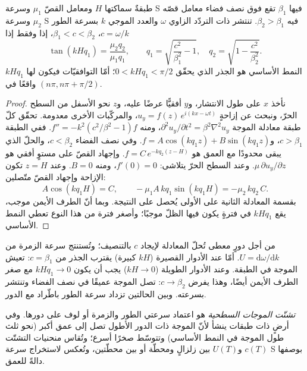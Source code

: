 \begin{theorem}\label{thm:b3:seismology-imaging:love}
طبقةٌ سماكتها $H$ ومعامل القصّ $\mu_1$ وسرعة S فيها $\beta_1$ تقع فوق
نصف فضاء معامل قصّه $\mu_2$ وسرعة S فيه $\beta_2 > \beta_1$. تنتشر 
ذات التردّد الزاوي $\omega$ والعدد الموجي $k$ بسرعة الطور
$c = \omega/k$، $\beta_1 < c < \beta_2$، إذا وفقط إذا
\[
  \tan\!\left(kH q_1\right) = \frac{\mu_2 q_2}{\mu_1 q_1},
  \qquad q_1 = \sqrt{\frac{c^2}{\beta_1^2} - 1},\quad
  q_2 = \sqrt{1 - \frac{c^2}{\beta_2^2}} .
\]
النمط الأساسي هو الجذر الذي يحقّق $0 < kHq_1 < \pi/2$؛ أمّا التوافقيّات فيكون لها
$kHq_1$ واقعًا في $(n\pi, n\pi + \pi/2)$.
\end{theorem}

\begin{proof}
نأخذ $x$ على طول الانتشار، و$y$ أفقيًّا عرضًا عليه، و$z$ نحو الأسفل من السطح الحرّ،
ونبحث عن إزاحةٍ
$u_y = f(z)\,e^{i(kx - \omega t)}$، والمركّبات الأخرى معدومة. تحقّق كلّ طبقة
معادلة الموجة $\partial^2 u_y/\partial t^2 = \beta^2\nabla^2 u_y$، ومنه
$f'' = -k^2\left(c^2/\beta^2 - 1\right) f$. ففي الطبقة $c > \beta_1$،
و$f = A\cos(kq_1z) + B\sin(kq_1z)$. وفي نصف الفضاء $c < \beta_2$، والحلّ
الذي يبقى محدودًا مع العمق هو $f = C\,e^{-kq_2(z - H)}$.
وإجهاد القصّ على مستوٍ أفقي هو $\mu\,\partial u_y/\partial z$.
وعند السطح الحرّ يتلاشى: $f'(0) = 0$، ومنه $B = 0$. وعند $z = H$ تكون
الإزاحة وإجهاد القصّ متّصلين:
\[
  A\cos(kq_1H) = C, \qquad -\mu_1 A\,kq_1\sin(kq_1H) = -\mu_2\,kq_2\,C .
\]
بقسمة المعادلة الثانية على الأولى يُحصل على النتيجة. وبما أنّ الطرف
الأيمن موجب، يقع $kHq_1$ في فترةٍ يكون فيها الظلّ موجبًا؛
 وأصغر فترة من هذا النوع تعطي النمط الأساسي.
\end{proof}

من أجل دورٍ معطى تُحلّ المعادلة لإيجاد $c$ بالتنصيف؛ وتُستنتج سرعة
الزمرة من $U = \mathrm d\omega/\mathrm dk$. أمّا عند الأدوار القصيرة
($kH$ كبيرة) يقترب الجذر من $c = \beta_1$: تعيش الموجة في الطبقة. وعند
الأدوار الطويلة ($kH \to 0$) يجب أن يكون $kHq_1 \to 0$ مع صغر الطرف الأيمن
أيضًا، وهذا يفرض $c \to \beta_2$: تصل الموجة عميقًا في
نصف الفضاء وتنتشر بسرعته. وبين الحالتين تزداد سرعة الطور
باطّراد مع الدور.

\begin{definition}\label{def:b3:seismology-imaging:dispersion}
\emph{تشتّت الموجات السطحية} هو اعتماد
سرعتي الطور والزمرة  أو لوف على دورها. وفي
أرضٍ ذات طبقات ينشأ لأنّ الموجة ذات الدور الأطول تصل إلى عمق أكبر
(نحو ثلث طول الموجة في النمط الأساسي) وتتوسّط صخرًا أسرع؛
 وتُقاس منحنيات التشتّت $c(T)$ و$U(T)$ بين زلزالٍ ومحطّة
أو بين محطّتين، وتُعكس لاستخراج سرعة S بوصفها
دالةً للعمق.
\end{definition}

